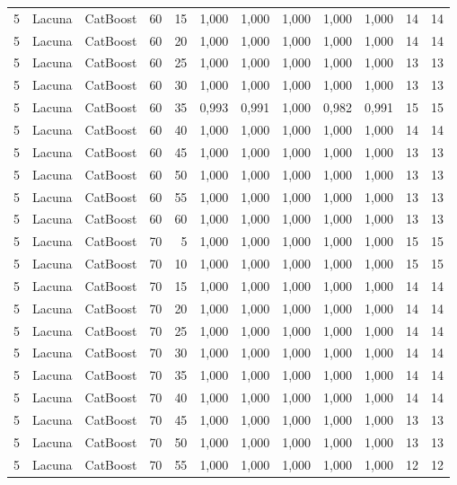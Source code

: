 \begin{longtable}{@{}rllrrrrrrrrr@{}}
5 & Lacuna & CatBoost & 60 & 15 & 1,000 & 1,000 & 1,000 & 1,000 & 1,000 & 14 & 14 \\
5 & Lacuna & CatBoost & 60 & 20 & 1,000 & 1,000 & 1,000 & 1,000 & 1,000 & 14 & 14 \\
5 & Lacuna & CatBoost & 60 & 25 & 1,000 & 1,000 & 1,000 & 1,000 & 1,000 & 13 & 13 \\
5 & Lacuna & CatBoost & 60 & 30 & 1,000 & 1,000 & 1,000 & 1,000 & 1,000 & 13 & 13 \\
5 & Lacuna & CatBoost & 60 & 35 & 0,993 & 0,991 & 1,000 & 0,982 & 0,991 & 15 & 15 \\
5 & Lacuna & CatBoost & 60 & 40 & 1,000 & 1,000 & 1,000 & 1,000 & 1,000 & 14 & 14 \\
5 & Lacuna & CatBoost & 60 & 45 & 1,000 & 1,000 & 1,000 & 1,000 & 1,000 & 13 & 13 \\
5 & Lacuna & CatBoost & 60 & 50 & 1,000 & 1,000 & 1,000 & 1,000 & 1,000 & 13 & 13 \\
5 & Lacuna & CatBoost & 60 & 55 & 1,000 & 1,000 & 1,000 & 1,000 & 1,000 & 13 & 13 \\
5 & Lacuna & CatBoost & 60 & 60 & 1,000 & 1,000 & 1,000 & 1,000 & 1,000 & 13 & 13 \\
5 & Lacuna & CatBoost & 70 & 5 & 1,000 & 1,000 & 1,000 & 1,000 & 1,000 & 15 & 15 \\
5 & Lacuna & CatBoost & 70 & 10 & 1,000 & 1,000 & 1,000 & 1,000 & 1,000 & 15 & 15 \\
5 & Lacuna & CatBoost & 70 & 15 & 1,000 & 1,000 & 1,000 & 1,000 & 1,000 & 14 & 14 \\
5 & Lacuna & CatBoost & 70 & 20 & 1,000 & 1,000 & 1,000 & 1,000 & 1,000 & 14 & 14 \\
5 & Lacuna & CatBoost & 70 & 25 & 1,000 & 1,000 & 1,000 & 1,000 & 1,000 & 14 & 14 \\
5 & Lacuna & CatBoost & 70 & 30 & 1,000 & 1,000 & 1,000 & 1,000 & 1,000 & 14 & 14 \\
5 & Lacuna & CatBoost & 70 & 35 & 1,000 & 1,000 & 1,000 & 1,000 & 1,000 & 14 & 14 \\
5 & Lacuna & CatBoost & 70 & 40 & 1,000 & 1,000 & 1,000 & 1,000 & 1,000 & 14 & 14 \\
5 & Lacuna & CatBoost & 70 & 45 & 1,000 & 1,000 & 1,000 & 1,000 & 1,000 & 13 & 13 \\
5 & Lacuna & CatBoost & 70 & 50 & 1,000 & 1,000 & 1,000 & 1,000 & 1,000 & 13 & 13 \\
5 & Lacuna & CatBoost & 70 & 55 & 1,000 & 1,000 & 1,000 & 1,000 & 1,000 & 12 & 12 \\

\end{longtable}
